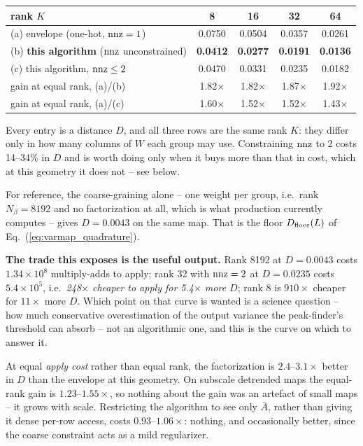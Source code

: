 \documentclass{article}
\numberwithin{equation}{section}   %
\begin{document}
\begin{center}
\begin{tabular}{lcccc}
rank $K$ & 8 & 16 & 32 & 64 \\
\hline
(a) envelope (one-hot, ${\rm nnz} = 1$) & 0.0750 & 0.0504 & 0.0357 & 0.0261 \\
(b) {\bf this algorithm} (${\rm nnz}$ unconstrained) & {\bf 0.0412} & {\bf 0.0277} & {\bf 0.0191} & {\bf 0.0136} \\
(c) this algorithm, ${\rm nnz} \le 2$ & 0.0470 & 0.0331 & 0.0235 & 0.0182 \\
\hline
gain at equal rank, (a)/(b) & 1.82$\times$ & 1.82$\times$ & 1.87$\times$ & 1.92$\times$ \\
gain at equal rank, (a)/(c) & 1.60$\times$ & 1.52$\times$ & 1.52$\times$ & 1.43$\times$ \\
\end{tabular}
\end{center}

Every entry is a distance $D$, and all three rows are the same rank $K$: they differ only in how
many columns of $W$ each group may use. Constraining ${\rm nnz}$ to 2 costs 14--34\% in $D$
and is worth doing only when it buys more than that in cost, which at this geometry it does not
-- see below.

For reference, the coarse-graining alone -- one weight per group, i.e.\ rank $N_\beta = 8192$ and
no factorization at all, which is what production currently computes -- gives $D = 0.0043$ on
the same map. That is the floor $D_{\rm floor}(L)$ of Eq.\ (\ref{eq:varmap_quadrature}).

{\bf The trade this exposes is the useful output.} Rank 8192 at $D = 0.0043$ costs
$1.34\times10^8$ multiply-adds to apply; rank 32 with ${\rm nnz}=2$ at $D = 0.0235$ costs
$5.4\times10^5$, i.e.\ {\em 248$\times$ cheaper to apply for 5.4$\times$ more $D$}; rank 8 is
$910\times$ cheaper for $11\times$ more $D$. Which point on that curve is wanted is a science
question -- how much conservative overestimation of the output variance the peak-finder's
threshold can absorb -- not an algorithmic one, and this is the curve on which to answer it.

At equal {\em apply cost} rather than equal rank, the factorization is $2.4$--$3.1\times$ better
in $D$ than the envelope at this geometry. On subscale detrended maps the equal-rank gain is
$1.23$--$1.55\times$, so nothing about the gain was an artefact of small maps -- it grows with
scale. Restricting the algorithm to see only $\bar A$, rather than giving it dense per-row
access, costs $0.93$--$1.06\times$: nothing, and occasionally better, since the coarse constraint
acts as a mild regularizer.
\end{document}
